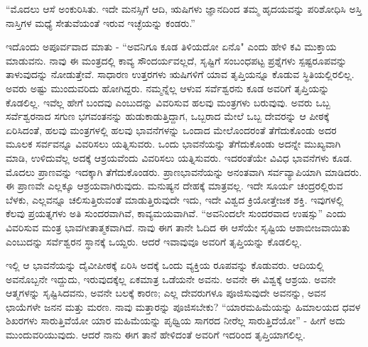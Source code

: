 “ಮೊದಲು ಆಸೆ ಅಂಕುರಿಸಿತು. ಇದೇ ಮನಸ್ಸಿಗೆ ಆದಿ, ಋಷಿಗಳು ಜ್ಞಾನದಿಂದ ತಮ್ಮ ಹೃದಯವನ್ನು ಪರಿಶೋಧಿಸಿ ಅಸ್ತಿ ನಾಸ್ತಿಗಳ ಮಧ್ಯೆ ಸೇತುವೆಯಂತೆ ಇರುವ ಇಚ್ಛೆಯನ್ನು ಕಂಡರು.”

ಇದೊಂದು ಅಪೂರ್ವವಾದ ಮಾತು - “ಅವನಿಗೂ ಕೂಡ ತಿಳಿಯದೋ ಏನೊ" ಎಂದು ಹೇಳಿ ಕವಿ ಮುಕ್ತಾಯ ಮಾಡುವನು. ನಾವು ಈ ಮಂತ್ರದಲ್ಲಿ ಕಾವ್ಯ ಸೌಂದರ್ಯವಲ್ಲದೆ, ಸೃಷ್ಟಿಗೆ ಸಂಬಂಧಪಟ್ಟ ಪ್ರಶ್ನೆಗಳು ಸ್ಪಷ್ಟರೂಪವನ್ನು ತಾಳುವುದನ್ನು ನೋಡುತ್ತೇವೆ. ಸಾಧಾರಣ ಉತ್ತರಗಳು ಋಷಿಗಳಿಗೆ ಯಾವ ತೃಪ್ತಿಯನ್ನೂ ಕೊಡುವ ಸ್ಥಿತಿಯಲ್ಲಿರಲಿಲ್ಲ. ಅವರು ಅಷ್ಟು ಮುಂದುವರಿದು ಹೋಗಿದ್ದರು. ನಮ್ಮನ್ನೆಲ್ಲ ಆಳುವ ಸರ್ವೆಶ್ವರನು ಕೂಡ ಅವರಿಗೆ ತೃಪ್ತಿಯನ್ನು ಕೊಡಲಿಲ್ಲ. ಇವೆಲ್ಲ ಹೇಗೆ ಬಂದವು ಎಂಬುದನ್ನು ವಿವರಿಸುವ ಹಲವು ಮಂತ್ರಗಳು ಬರುವುವು. ಅವರು ಒಬ್ಬ ಸರ್ವೆಶ್ವರನಾದ ಸಗುಣ ಭಗವಂತನನ್ನು ಹುಡುಕಾಡುತ್ತಿದ್ದಾಗ, ಒಬ್ಬರಾದ ಮೇಲೆ ಒಬ್ಬ ದೇವರನ್ನು ಆ ಪೀಠಕ್ಕೆ ಏರಿಸಿದಂತೆ, ಹಲವು ಮಂತ್ರಗಳಲ್ಲಿ ಹಲವು ಭಾವನೆಗಳನ್ನು ಒಂದಾದ ಮೇಲೊಂದರಂತೆ ತೆಗೆದುಕೊಂಡು ಅದರ ಮೂಲಕ ಸರ್ವವನ್ನೂ ವಿವರಿಸಲು ಯತ್ನಿಸುವರು. ಒಂದು ಭಾವನೆಯನ್ನು ತೆಗೆದುಕೊಂಡು ಅದನ್ನೇ ಮುಖ್ಯವಾಗಿ ಮಾಡಿ, ಉಳಿದುವೆಲ್ಲ ಅದಕ್ಕೆ ಆಶ್ರಯವೆಂದು ವಿವರಿಸಲು ಯತ್ನಿಸುವರು. ಇದರಂತೆಯೇ ವಿವಿಧ ಭಾವನೆಗಳು ಕೂಡ. ಮೊದಲು ಪ್ರಾಣವನ್ನು ಇದಕ್ಕಾಗಿ ತೆಗೆದುಕೊಂಡರು. ಪ್ರಾಣಭಾವನೆಯನ್ನು ಅನಂತವಾಗಿ ಸರ್ವವ್ಯಾಪಿಯಾಗಿ ಮಾಡಿದರು. ಈ ಪ್ರಾಣವೇ ಎಲ್ಲಕ್ಕೂ ಆಶ್ರಯವಾಗಿರುವುದು. ಮನುಷ್ಯನ ದೇಹಕ್ಕೆ ಮಾತ್ರವಲ್ಲ. ಇದೇ ಸೂರ್ಯ ಚಂದ್ರರಲ್ಲಿರುವ ಬೆಳಕು, ಎಲ್ಲವನ್ನೂ ಚಲಿಸುತ್ತಿರುವಂತೆ ಮಾಡುತ್ತಿರುವುದೇ ಇದು, ಇದೇ ವಿಶ್ವದ ಕ್ರಿಯೋತ್ತೇಜಕ ಶಕ್ತಿ. ಇವುಗಳಲ್ಲಿ ಕೆಲವು ಪ್ರಯತ್ನಗಳು ಅತಿ ಸುಂದರವಾಗಿವೆ, ಕಾವ್ಯಮಯವಾಗಿವೆ. “ಅವನಿಂದಲೇ ಸುಂದರವಾದ ಉಷಸ್ಸು” ಎಂದು ವಿವರಿಸುವ ಮಂತ್ರ ಭಾವಗೀತಾತ್ಮಕವಾಗಿದೆ. ನಾವು ಈಗ ತಾನೇ ಓದಿದ ಈ ಆಸೆಯೇ ಸೃಷ್ಟಿಯ ಆಶಾಬೀಜವಾಯಿತು ಎಂಬುದನ್ನು ಸರ್ವೆಶ್ವರನ ಸ್ಥಾನಕ್ಕೆ ಒಯ್ದರು. ಆದರೆ ಇವಾವುವೂ ಅವರಿಗೆ ತೃಪ್ತಿಯನ್ನು ಕೊಡಲಿಲ್ಲ.

ಇಲ್ಲಿ ಆ ಭಾವನೆಯನ್ನು ದೈವೀಪೀಠಕ್ಕೆ ಏರಿಸಿ ಅದಕ್ಕೆ ಒಂದು ವ್ಯಕ್ತಿಯ ರೂಪವನ್ನು ಕೊಡುವರು. ಆದಿಯಲ್ಲಿ ಅವನೊಬ್ಬನೇ ಇದ್ದುದು, ಇರುವುದಕ್ಕೆಲ್ಲ ಏಕಮಾತ್ರ ಒಡೆಯನೇ ಅವನು. ಅವನೇ ಈ ವಿಶ್ವಕ್ಕೆ ಆಶ್ರಯ. ಅವನೇ ಆತ್ಮಗಳನ್ನು ಸೃಷ್ಟಿಸಿದವನು, ಅವನೇ ಬಲಕ್ಕೆ ಕಾರಣ; ಎಲ್ಲ ದೇವರುಗಳೂ ಪೂಜಿಸುವುದೇ ಅವನನ್ನು, ಅವನ ಛಾಯೆಗಳೇ ಜನನ ಮತ್ತು ಮರಣ. ನಾವು ಮತ್ತಾರನ್ನು ಪೂಜಿಸಬೇಕು? “ಯಾರ\break ಮಹಿಮೆಯನ್ನು ಹಿಮಾಲಯದ ಧವಳ ಶಿಖರಗಳು ಸಾರುತ್ತಿವೆಯೋ ಯಾರ ಮಹಿಮೆಯನ್ನು ಪೃಥ್ವಿಯ ಸಾಗರದ ನೀರೆಲ್ಲ ಸಾರುತ್ತಿದೆಯೋ'' - ಹೀಗೆ ಅದು ಮುಂದುವರಿಯುವುದು. ಆದರೆ ನಾನು ಈಗ ತಾನೆ ಹೇಳಿದಂತೆ ಅವರಿಗೆ ಇದರಿಂದ ತೃಪ್ತಿಯಾಗಲಿಲ್ಲ.

